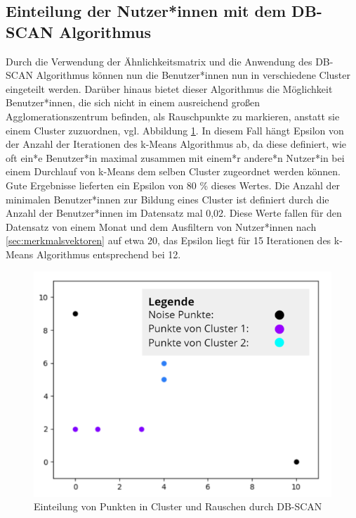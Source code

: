 \subsection{Einteilung der Nutzer*innen mit dem DB-SCAN Algorithmus}
Durch die Verwendung der Ähnlichkeitsmatrix und die Anwendung des DB-SCAN Algorithmus können nun die Benutzer*innen nun in verschiedene Cluster eingeteilt werden. Darüber hinaus bietet dieser Algorithmus die Möglichkeit Benutzer*innen, die sich nicht in einem ausreichend großen Agglomerationszentrum befinden, als Rauschpunkte zu markieren, anstatt sie einem Cluster zuzuordnen, vgl. Abbildung \ref{fig:dbscan}. In diesem Fall hängt Epsilon von der Anzahl der Iterationen des k-Means Algorithmus ab, da diese definiert, wie oft ein*e Benutzer*in maximal zusammen mit einem*r andere*n Nutzer*in bei einem Durchlauf von k-Means dem selben Cluster zugeordnet werden können. Gute Ergebnisse lieferten ein Epsilon von 80 \% dieses Wertes. Die Anzahl der minimalen Benutzer*innen zur Bildung eines Cluster ist definiert durch die Anzahl der Benutzer*innen im Datensatz mal 0,02. Diese Werte fallen für den Datensatz von einem Monat und dem Ausfiltern von Nutzer*innen nach \ref{sec:merkmalsvektoren} auf etwa 20, das Epsilon liegt für 15 Iterationen des k-Means Algorithmus entsprechend bei 12. 
\begin{figure}[h]
	\centering
	\includegraphics[width=0.5\linewidth]{images/db_scan_example}
	\caption{Einteilung von Punkten in Cluster und Rauschen durch DB-SCAN}
	\label{fig:dbscan}
\end{figure}
